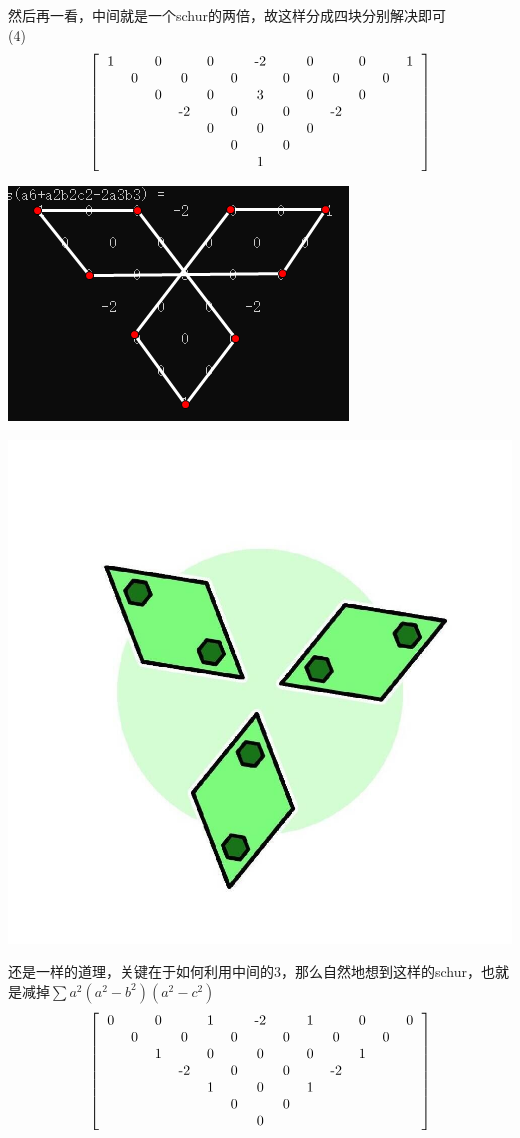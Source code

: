 \documentclass[UTF8]{ctexart}
\begin{document}
然后再一看，中间就是一个schur的两倍，故这样分成四块分别解决即可\\
(4)\renewcommand*{\arraystretch}{1.732}\[\left[\begin{matrix}
	\begin{tabular}{ccccccccccccc}
		1& &0& &0& &-2& &0& &0& &1\\
		&0& &0& &0& &0& &0& &0&\\
		& &0& &0& &3& &0& &0& &\\
		& & &-2& &0& &0& &-2& & &\\
		& & & &0& &0& &0& & & &\\
		& & & & &0& &0& & & & &\\
		& & & & & &1& & & & & &\\
	\end{tabular}
\end{matrix}\right]\]
\begin{center}
	\includegraphics[width=0.5\linewidth]{23}
\end{center}
\begin{center}
	\includegraphics[width=0.4\linewidth]{21}
\end{center}
还是一样的道理，关键在于如何利用中间的3，那么自然地想到这样的schur，也就是减掉$ \displaystyle  \sum a^{2}(a^{2}-b^{2})(a^{2}-c^{2}) $
\renewcommand*{\arraystretch}{1.732}\[\left[\begin{matrix}
	\begin{tabular}{ccccccccccccc}
		0& &0& &1& &-2& &1& &0& &0\\
		&0& &0& &0& &0& &0& &0&\\
		& &1& &0& &0& &0& &1& &\\
		& & &-2& &0& &0& &-2& & &\\
		& & & &1& &0& &1& & & &\\
		& & & & &0& &0& & & & &\\
		& & & & & &0& & & & & &\\
	\end{tabular}
\end{matrix}\right]\]
\end{document}
